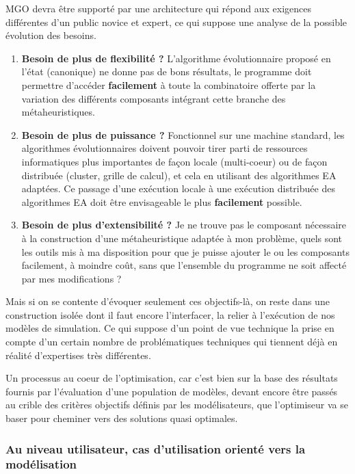MGO devra être supporté par une architecture qui répond aux exigences différentes d'un public novice et expert, ce qui suppose une analyse de la possible évolution des besoins.

\begin{enumerate}
	\item{\textbf{Besoin de plus de flexibilité ?}} L'algorithme évolutionnaire proposé en l'état (canonique) ne donne pas de bons résultats, le programme doit permettre d'accéder \textbf{facilement} à toute la combinatoire offerte par la variation des différents composants intégrant cette branche des métaheuristiques.

	\item{\textbf{Besoin de plus de puissance ?}} Fonctionnel sur une machine standard, les algorithmes évolutionnaires doivent pouvoir tirer parti de ressources informatiques plus importantes de façon locale (multi-coeur) ou de façon distribuée (cluster, grille de calcul), et cela en utilisant des algorithmes EA adaptées. Ce passage d'une exécution locale à une exécution distribuée des algorithmes EA doit être envisageable le plus \textbf{facilement} possible.

	\item{\textbf{Besoin de plus d'extensibilité ?}} Je ne trouve pas le composant nécessaire à la construction d'une métaheuristique adaptée à mon problème, quels sont les outils mis à ma disposition pour que je puisse ajouter le ou les composants facilement, à moindre coût, sans que l'ensemble du programme ne soit affecté par mes modifications ?
\end{enumerate}

Mais si on se contente d'évoquer seulement ces objectifs-là, on reste dans une construction isolée dont il faut encore l'interfacer, la relier à l'exécution de nos modèles de simulation. Ce qui suppose d'un point de vue technique la prise en compte d'un certain nombre de problématiques techniques qui tiennent déjà en réalité d'expertises très différentes.

Un processus au coeur de l'optimisation, car c'est bien sur la base des résultats fournis par l'évaluation d'une population de modèles, devant encore être passés au crible des critères objectifs définis par les modélisateurs, que l'optimiseur va se baser pour cheminer vers des solutions quasi optimales.

\subsubsection{Au niveau utilisateur, cas d'utilisation orienté vers la modélisation }

